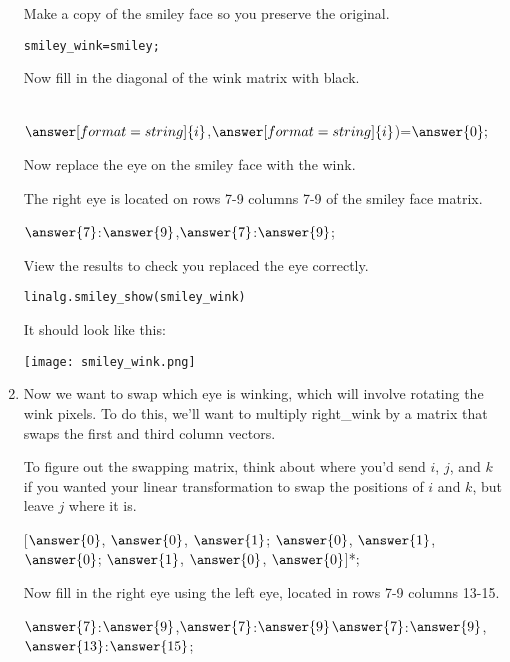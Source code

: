 \documentclass{ximera}
\begin{document}
\begin{problem}
\begin{enumerate}
Make a copy of the smiley face so you preserve the original.
\begin{verbatim}
smiley_wink=smiley;
\end{verbatim}

Now fill in the diagonal of the wink matrix with black.

 \\
$\answer[format=string]{i}$,$\answer[format=string]{i}$)=$\answer{0};$\\

Now replace the eye on the smiley face with the wink.
\begin{hint}
The right eye is located on rows 7-9 columns 7-9 of the smiley face matrix.
\end{hint}

$\answer{7}$:$\answer{9}$,$\answer{7}$:$\answer{9}$;

View the results to check you replaced the eye correctly.
\begin{verbatim}
linalg.smiley_show(smiley_wink)
\end{verbatim}

It should look like this:
\begin{center}
\texttt{[image: smiley\_wink.png]}
\end{center}

\item Now we want to swap which eye is winking, which will involve rotating the wink pixels. To do this, we'll want to multiply right\_wink by a matrix that swaps the first and third column vectors. 

To figure out the swapping matrix, think about where you'd send $i$, $j$, and $k$ if you wanted your linear transformation to swap the positions of $i$ and $k$, but leave $j$ where it is.

[$\answer{0}$, $\answer{0}$, $\answer{1}$; $\answer{0}$, $\answer{1}$, $\answer{0}$; $\answer{1}$, $\answer{0}$, $\answer{0}$]*;

Now fill in the right eye using the left eye, located in rows 7-9 columns 13-15.

$\answer{7}$:$\answer{9}$,$\answer{7}$:$\answer{9}$$\answer{7}$:$\answer{9}$,$\answer{13}$:$\answer{15}$\mtlb{)};


\end{enumerate}
\end{problem}
\end{document}
